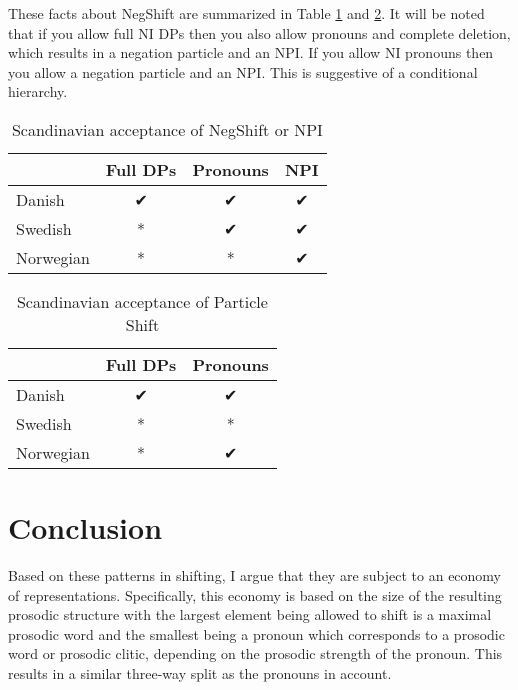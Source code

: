 \documentclass[12pt, letterpaper]{article}
\begin{document}
These facts about NegShift are summarized in Table \ref{tab:Paradigm} and \ref{tab:Paradigm2}. It will be noted that if you allow full NI DPs then you also allow pronouns and complete deletion, which results in a negation particle and an NPI. If you allow NI pronouns then you allow a negation particle and an NPI. This is suggestive of a conditional hierarchy. 

\begin{table}[!ht]
	\centering
	\caption{Scandinavian acceptance of NegShift or NPI}
	\label{tab:Paradigm}
\begin{tabular}{lccc}
	\hline 
	& Full DPs & Pronouns & NPI\\
	\hline
	Danish & ✔︎ & ✔︎ & ✔︎ \\
	Swedish & * & ✔︎ & ✔︎ \\
	Norwegian & * & * & ✔︎ \\
	\hline 
\end{tabular} 
\end{table}

\begin{table}[!ht]
	\centering
	\caption{Scandinavian acceptance of Particle Shift}
	\label{tab:Paradigm2}
\begin{tabular}{lcc}
	\hline 
	& Full DPs & Pronouns \\
	\hline
	Danish & ✔︎ & ✔︎  \\
	Swedish & * & *  \\
	Norwegian & * & ✔︎ \\
	\hline 
\end{tabular} 
\end{table}
\section{Conclusion} \label{sec:Conclusion}

Based on these patterns in shifting, I argue that they are subject to an economy of representations. Specifically, this economy is based on the size of the resulting prosodic structure with the largest element being allowed to shift is a maximal prosodic word and the smallest being a pronoun which corresponds to a prosodic word or prosodic clitic, depending on the prosodic strength of the pronoun. This results in a similar three-way split as the pronouns in  account. 
\end{document}
